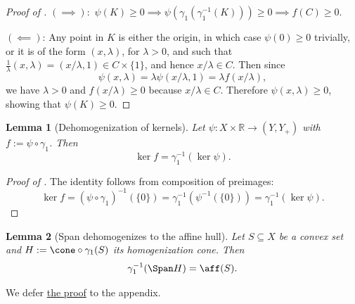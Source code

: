 \documentclass{article}
\theoremstyle{plain}
\newtheorem{lemma}[lemma]{Lemma}
\theoremstyle{definition}
\theoremstyle{remark}
\begin{document}
\begin{proof}[\hypertarget{loc:preservation_of_orientation_in_dehomogenization.proof}{}Proof of ]

$(\implies):$ $\psi(K) \geq 0  \implies \psi(\gamma_1(\gamma_1^{-1}(K))) \geq 0  \implies f(C) \geq 0$.

$(\impliedby)$: Any point in $K$ is either the origin, in which case $\psi(0) \geq 0$ trivially, or it is of the form $(x,\lambda)$, for $\lambda > 0$, and such that $\frac{1}{\lambda}(x,\lambda) = (x /\lambda, 1)  \in C  \times \{ 1 \}$, and hence $x /\lambda  \in C$. Then since
\begin{equation*}
\psi(x,\lambda) = \lambda \psi(x / \lambda, 1) = \lambda f(x / \lambda),
\end{equation*}
we have $\lambda > 0$ and $f(x /\lambda) \geq 0$ because $x /\lambda  \in C$. Therefore $\psi(x,\lambda) \geq 0$, showing that $\psi(K) \geq 0$.
\end{proof}
\begin{lemma}[Dehomogenization of kernels]
\label{loc:dehomogenization_of_kernels.statement}
Let $\psi:X  \times \mathbb{R} \to (Y,Y_+)$ with $f := \psi \circ \gamma_1$. 
Then
\begin{equation*}
\ker f = \gamma_1^{-1}(\ker \psi).
\end{equation*}
\end{lemma}
\begin{proof}[\hypertarget{loc:dehomogenization_of_kernels.proof}{}Proof of ]

The identity follows from composition of preimages:
\begin{equation*}
\ker f = (\psi \circ \gamma_1)^{-1}(\{0\}) = \gamma_1^{-1}\left(\psi^{-1}(\{0\})\right) = \gamma_1^{-1}(\ker \psi).
\end{equation*}
\end{proof}
\begin{lemma}[Span dehomogenizes to the affine hull]
\label{loc:span_dehomogenizes_to_the_affine_hull.statement}
Let $S \subseteq X$ be a convex set and $H := \cone \circ \gamma_1(S)$ its homogenization cone. Then
\begin{equation*}
\gamma_1^{-1}(\Span H) = \aff(S).
\end{equation*}
\end{lemma}
We defer \hyperlink{loc:span_dehomogenizes_to_the_affine_hull.proof}{the proof} to the appendix.
\end{document}
